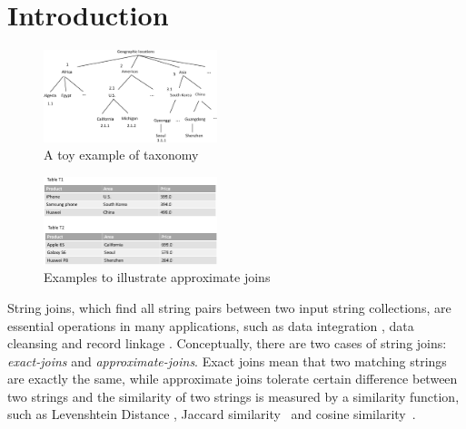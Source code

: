 \section{Introduction}

\begin{figure}[t]
\centering
\includegraphics[width=0.45\textwidth]{figures/taxonomylabels}
 \caption{A toy example of taxonomy}
\label{fig:taxonomyexample}
\end{figure}


\begin{figure}[t]
\centering
\includegraphics[width=0.45\textwidth]{figures/productexample}
 \caption{Examples to illustrate approximate joins}
\label{fig:twotables}
\end{figure}



 String joins, which find all string pairs between two input string collections, are essential operations in many applications, such as  data integration \cite{conf/sigmod/Sarawagi04}, data cleansing \cite{conf/vldb/ArasuGK06,journals/www/LiJM06} and record linkage \cite{books/Winkler99}. Conceptually, there are two cases of string joins: \textit{exact-joins} and \textit{approximate-joins}. Exact joins mean that two matching strings are exactly the same, while approximate joins tolerate certain difference between two strings and the similarity of two strings is measured by a similarity function, such as  Levenshtein Distance
\cite{journals/pvldb/XiaoWL08,conf/sigmod/WangLF12},  Jaccard
similarity~\cite{conf/icde/ChaudhuriGK06} and cosine
similarity~\cite{journals/ipm/SaltonB88}.

